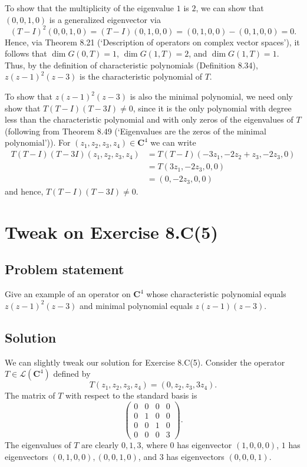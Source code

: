 \documentclass{article}
\begin{document}
To show that the multiplicity of the eigenvalue $1$ is $2$, we can show that $(0,0,1,0)$ is a generalized eigenvector via
\[(T-I)^2(0,0,1,0)=(T-I)(0,1,0,0)=(0,1,0,0)-(0,1,0,0)=0.\]
Hence, via Theorem 8.21 (`Description of operators on complex vector spaces'), it follows that $\operatorname{dim}G(0,T)=1$, $\operatorname{dim}G(1,T)=2$, and $\operatorname{dim}G(1,T)=1$. Thus, by the definition of characteristic polynomials (Definition 8.34), $z(z-1)^2(z-3)$ is the characteristic polynomial of $T$.

To show that $z(z-1)^2(z-3)$ is also the minimal polynomial, we need only show that $T(T-I)(T-3I)\neq 0$, since it is the only polynomial with degree less than the characteristic polynomial and with only zeros of the eigenvalues of $T$ (following from Theorem 8.49 (`Eigenvalues are the zeros of the minimal polynomial')). 
For $(z_1,z_2,z_3,z_4)\in\mathbf{C}^4$ we can write
\begin{align*}
    T(T-I)(T-3I)(z_1,z_2,z_3,z_4)&=T(T-I)(-3z_1,-2z_2+z_3,-2z_3,0)\\
    &=T(3z_1,-2z_3,0,0)\\
    &=(0,-2z_3,0,0)
\end{align*}
and hence, $T(T-I)(T-3I)\neq 0$. 

\clearpage

\section{Tweak on Exercise 8.C(5)}
\subsection*{Problem statement}
Give an example of an operator on $\mathbf{C}^4$ whose characteristic polynomial equals $z(z-1)^2(z-3)$ and minimal polynomial equals $z(z-1)(z-3)$.

\subsection*{Solution}
We can slightly tweak our solution for Exercise 8.C(5). 
Consider the operator $T\in\mathcal{L}(\mathbf{C}^4)$ defined by
\begin{equation*}
T(z_1,z_2,z_3,z_4)=(0,z_2,z_3,3z_4).
\end{equation*}
The matrix of $T$ with respect to the standard basis is
\begin{equation*}
\begin{pmatrix}
0 & 0 & 0 & 0\\
0 & 1 & 0 & 0\\
0 & 0 & 1 & 0\\
0 & 0 & 0 & 3
\end{pmatrix}.
\end{equation*}
The eigenvalues of $T$ are clearly $0,1,3$, where $0$ has eigenvector $(1,0,0,0)$, $1$ has eigenvectors $(0,1,0,0),(0,0,1,0)$, and $3$ has eigenvectors $(0,0,0,1)$. 
\end{document}

